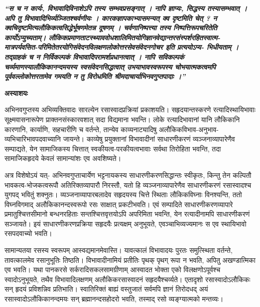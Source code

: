 \documentclass[10pt, a5paper, twoside]{article}
\newcommand{\customparagraph}[1]{
    \noindent \textbf{#1} \par
    \penalty 10000 %
    \vspace{0.1cm plus 0.05cm minus 0.02cm}
    \penalty 10000 %
}
\begin{document}
\textit{\textbf{``स च न कार्यः, विभावादिविनाशेऽपि तस्य सम्भवप्रसङ्गात् । नापि ज्ञाप्यः, सिद्धस्य तस्यासम्भवात् । अपि तु विभावादिभिर्व्यञ्जितश्चर्वणीयः । कारकज्ञापकाभ्यासमन्यत् क्व दृष्टमिति चेत् ? न क्वचिदृष्टमित्यलौकिकत्वसिद्धेर्भूषणमेतन्न दूषणम् । चर्वणानिष्पत्त्या तस्य निष्पत्तिरूपचरितेति कार्योऽप्युच्यताम्। लौकिकप्रमाणताटस्थ्याववोधशालिमितयोगिज्ञानवेद्यान्तरसंस्पर्शरहितस्वात्म- मात्रपर्यवसित-परिमितेतरयोगिसंवेदनविलक्षणलोकोत्तरसेवसंवेदनगोचर इति प्रत्ययोऽप्य- भिधीयताम् । तद्‌ग्राहकं च न निर्विकल्पकं विभावादिपरामर्शप्रधानत्वात् । नापि सविकल्पकं चर्व्यमाणस्यालौकिकानन्दमयस्य स्वसंवेदनसिद्धत्वात् उभयाभावस्वरूपस्य चोभयात्मकत्वमपि पूर्ववल्लोकोत्तरतामेव गमयति न तु विरोधमिति श्रीमदाचार्याभिनवगुप्तपादाः ।''}}

\customparagraph{\textbf{अस्याशयः}}

अभिनवगुप्तस्य अभिव्यक्तिवादः सारल्येन रसास्वादप्रक्रियां प्रकाशयति। सहृदयान्तस्करणे रत्यादिस्थायिभावाः सूक्ष्मवासनारूपेण प्राक्तनसंस्कारवशात् सदा विद्यमाना भवन्ति। लोके रत्यादिभावानां यानि लौकिकानि कारणानि, कार्याणि, सहचारीणि च वर्तन्ते, तान्येव काव्यनाट्यादिषु अलौकिकविभाव-अनुभाव-व्यभिचारिभावपदवाच्यानि जायन्ते। काव्येषु प्रयुक्तानां विभावादीनां साधारणीकरणं व्यञ्जनाव्यापारेणैव सम्पाद्यते, येन सामाजिकस्य चित्तात् स्वकीयत्व-परकीयत्वभावाः सर्वथा तिरोहिता भवन्ति, तदा सामाजिकहृदये केवलं सामान्यांशः एव अवशिष्यते।

अत्र विशेषोऽयं यत्- अभिनवगुप्ताचार्येण भट्टनायकस्य साधारणीकरणसिद्धान्तः स्वीकृतः, किन्तु तेन कल्पितौ भावकत्व-भोजकत्वरूपौ अतिरिक्तव्यापारौ निरस्तौ, यतो हि व्यञ्जनाव्यापारेणैव साधारणीकरणं रसास्वादश्च युगपद् भवितुं शक्नुतः। व्यञ्जनाव्यापारबलादेव सहृदयस्य चित्ते स्थिताः लौकिकविघ्नाः विनश्यन्ति, ततो विघ्नविगमाद् अलौकिकानन्दस्वरूपो रसः साक्षात् प्रकटीभवति। एवं सम्पादिते साधारणीकरणव्यापारे प्रमातुश्चित्तसीमानो बन्धनरहिताः सन्तश्चित्तवृत्तयोऽपि अपरिमिता भवन्ति, येन रत्यादीनामपि साधारणीकरणं सञ्जायते। इयं साधारणीकरणप्रक्रिया सहृदयैः प्रत्यक्षम् अनुभूयते, एवञ्चाभिव्यज्यमानः स एव स्थायिभावो रसपदवाच्यो भवति।

सामान्यतया रसस्य स्वरूपम् आस्वद्यमानमेवास्ति। यावत्कालं विभावादयः पुरतः समुत्स्थिता वर्तन्ते, तावत्कालमेव रसानुभूतिः तिष्ठति। विभावादीनामियं प्रतीतिः पृथक् पृथग् रूपा न भवति, अपितु अखण्डात्मिका एव भवति। यथा पानकरसे सर्करादिसकलसामग्रीणाम् आस्वादत भोक्ता एको विलक्षणोऽपूर्वश्च स्वादोऽनुभूयते, तथैव विभावादिलक्षणम् अलौकिकरसास्वादनं सहृदयैश्चर्व्यते। एतादृशो रसास्वादोऽलौकिकः सन् हृदयं प्रविशन्निव प्रतिभाति। स्वातिरिक्तं बाह्यं वस्तुजातं सर्वमपि ज्ञानं तिरोदधद् अयं रसास्वादोऽलौकिकानन्दमयः सन् ब्रह्मानन्दसहोदरो भवति, तस्माद् रसो व्यङ्ग्यात्मको मन्तव्यः।
\end{document}
